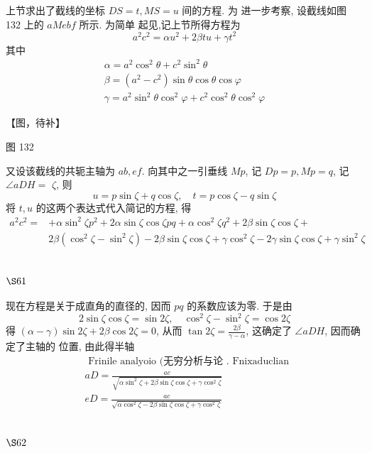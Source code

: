 上节求出了截线的坐标 $D S=t, M S=u$ 间的方程. 为 进一步考察, 设截线如图 132 上的 $a M e b f$ 所示. 为简单 起见,记上节所得方程为
\[
a^{2} c^{2}=\alpha u^{2}+2 \beta t u+\gamma t^{2}
\]
其中
\[
\begin{gathered}
\alpha=a^{2} \cos ^{2} \theta+c^{2} \sin ^{2} \theta \\
\beta=\left(a^{2}-c^{2}\right) \sin \theta \cos \theta \cos \varphi \\
\gamma=a^{2} \sin ^{2} \theta \cos ^{2} \varphi+c^{2} \cos ^{2} \theta \cos ^{2} \varphi
\end{gathered}
\]

【图，待补】

图 132

又设该截线的共轭主轴为 $a b, e f$. 向其中之一引垂线 $M p$, 记 $D p=p, M p=q$, 记 $\angle a D H=$ $\zeta$, 则
\[
u=p \sin \zeta+q \cos \zeta, \quad t=p \cos \zeta-q \sin \zeta
\]
将 $t, u$ 的这两个表达式代入简记的方程, 得
\[
\begin{aligned}
a^{2} c^{2}= & +\alpha \sin ^{2} \zeta p^{2}+2 \alpha \sin \zeta \cos \zeta p q+\alpha \cos ^{2} \zeta q^{2}+2 \beta \sin \zeta \cos \zeta+ \\
& 2 \beta\left(\cos ^{2} \zeta-\sin ^{2} \zeta\right)-2 \beta \sin \zeta \cos \zeta+\gamma \cos ^{2} \zeta-2 \gamma \sin \zeta \cos \zeta+\gamma \sin ^{2} \zeta
\end{aligned}
\]
\section{$\S 61$}

现在方程是关于成直角的直径的, 因而 $p q$ 的系数应该为零. 于是由
\[
2 \sin \zeta \cos \zeta=\sin 2 \zeta, \quad \cos ^{2} \zeta-\sin ^{2} \zeta=\cos 2 \zeta
\]
得 $(\alpha-\gamma) \sin 2 \zeta+2 \beta \cos 2 \zeta=0$, 从而 $\tan 2 \zeta=\frac{2 \beta}{\gamma-\alpha}$, 这确定了 $\angle a D H$, 因而确定了主轴的 位置, 由此得半轴 
\[
\begin{aligned}
& \text { Frinile analyoio (无穷分析与论 . Fnixaduclian } \\
& a D=\frac{a c}{\sqrt{\alpha \sin ^{2} \zeta+2 \beta \sin \zeta \cos \zeta+\gamma \cos ^{2} \zeta}} \\
& e D=\frac{a c}{\sqrt{\alpha \cos ^{2} \zeta-2 \beta \sin \zeta \cos \zeta+\gamma \cos ^{2} \zeta}}
\end{aligned}
\]
\section{$\S 62$}

